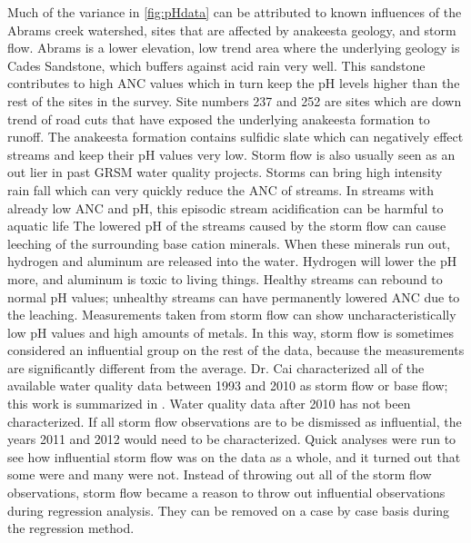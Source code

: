 Much of the variance in \autoref{fig:pHdata} can be attributed to known influences of the Abrams creek watershed, sites that are affected by anakeesta geology, and storm flow. Abrams is a lower elevation, low trend area where the underlying geology is Cades Sandstone, which buffers against acid rain very well. This sandstone contributes to high ANC values which in turn keep the pH levels higher than the rest of the sites in the survey. Site numbers 237 and 252 are sites which are down trend of road cuts that have exposed the underlying anakeesta formation to runoff. The anakeesta formation contains sulfidic slate which can negatively effect streams and keep their pH values very low.
Storm flow is also usually seen as an out lier in past GRSM water quality projects. Storms can bring high intensity rain fall which can very quickly reduce the ANC of streams. In streams with already low ANC and pH, this episodic stream acidification can be harmful to aquatic life \citep{neff2009physiological} The lowered pH of the streams caused by the storm flow can cause leeching of the surrounding base cation minerals. When these minerals run out, hydrogen and aluminum are released into the water. Hydrogen will lower the pH more, and aluminum is toxic to living things. Healthy streams can rebound to normal pH values; unhealthy streams can have permanently lowered ANC due to the leaching. %
Measurements taken from storm flow can show uncharacteristically low pH values and high amounts of metals. In this way, storm flow is sometimes considered an influential group on the rest of the data, because the measurements are significantly different from the average. Dr. Cai characterized all of the available water quality data between 1993 and 2010 as storm flow or base flow; this work is summarized in \citet{cai2012}. Water quality data after 2010 has not been characterized. If all storm flow observations are to be dismissed as influential, the years 2011 and 2012 would need to be characterized. Quick analyses were run to see how influential storm flow was on the data as a whole, and it turned out that some were and many were not. Instead of throwing out all of the storm flow observations, storm flow became a reason to throw out influential observations during regression analysis. They can be removed on a case by case basis during the regression method.


